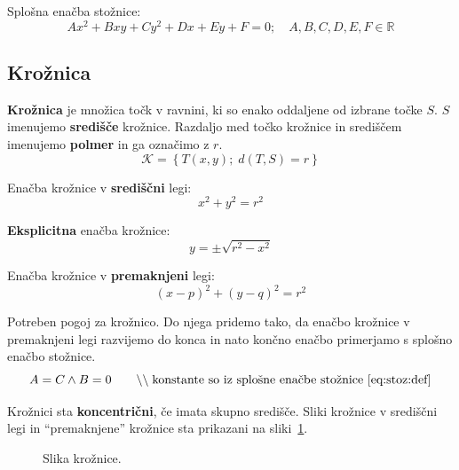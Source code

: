 \documentclass[a4paper,oneside,12pt,fleqn]{article}
\def\R{\ensuremath{\mathbb R}}
\newcommand{\comment}[1]{\ensuremath{\qquad\backslash\backslash\;}\textnormal{#1}}
\newcommand{\beforecaptionskip}{\vspace{-12pt}}
\numberwithin{equation}{section}
\begin{document}
Splošna enačba stožnice:
\begin{equation}
  Ax^2 + Bxy + Cy^2 + Dx + Ey + F = 0; \quad A, B, C, D, E, F \in \R
  \label{eq:stoz:def}
\end{equation}

\subsection{Krožnica}
\label{sec:stoz:kroz}
\textbf{Krožnica} je množica točk v ravnini, ki so enako oddaljene od izbrane točke $S$. $S$
imenujemo \textbf{središče} krožnice. Razdaljo med točko krožnice in središčem imenujemo
\textbf{polmer} in
ga označimo z $r$.
\[ \mathcal{K} = \left\{ T(x, y); \; d(T, S) = r \right\} \]

Enačba krožnice v \textbf{središčni} legi:
\[ x^2 + y^2 = r^2 \]

\textbf{Eksplicitna} enačba krožnice:
\begin{equation}
    y = \pm \sqrt{r^2 - x^2}
  \label{eq:kroz:eksp}
\end{equation}

Enačba krožnice v \textbf{premaknjeni} legi:
\[ (x-p)^2 + (y-q)^2 = r^2 \]

Potreben pogoj za krožnico. Do njega pridemo tako, da enačbo krožnice v premaknjeni legi
razvijemo do konca in nato končno enačbo primerjamo s splošno enačbo stožnice.
\[ A = C \land B = 0 \comment{konstante so iz splošne enačbe stožnice \eqref{eq:stoz:def}} \]

Krožnici sta \textbf{koncentrični}, če imata skupno središče.
Sliki krožnice v središčni legi in ``premaknjene'' krožnice sta prikazani na
sliki~\ref{fig:stoz:kroz}.

\begin{figure}[ht]
  \begin{center}
  \end{center}
  \beforecaptionskip
  \caption{Slika krožnice.}
  \label{fig:stoz:kroz}
\end{figure}
\end{document}
